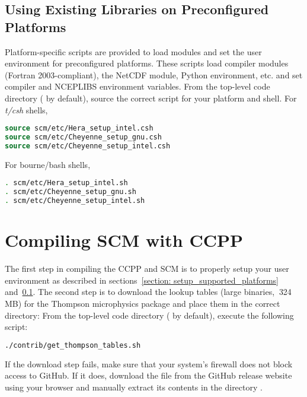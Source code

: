 \subsection{Using Existing Libraries on Preconfigured Platforms}\label{section: use_preconfigured_platforms}
Platform-specific scripts are provided to load modules and set the user environment for preconfigured platforms. These scripts load compiler modules (Fortran 2003-compliant), the NetCDF module, Python environment, etc. and set compiler and NCEPLIBS environment variables. From the top-level code directory ( by default), source the correct script for your platform and shell. For \textit{t/csh} shells,
\begin{lstlisting}[language=csh]
source scm/etc/Hera_setup_intel.csh
source scm/etc/Cheyenne_setup_gnu.csh
source scm/etc/Cheyenne_setup_intel.csh
\end{lstlisting}
For bourne/bash shells,
\begin{lstlisting}[language=bash]
. scm/etc/Hera_setup_intel.sh
. scm/etc/Cheyenne_setup_gnu.sh
. scm/etc/Cheyenne_setup_intel.sh
\end{lstlisting}

\section{Compiling SCM with CCPP}
\label{section: compiling}
The first step in compiling the CCPP and SCM is to properly setup your user environment as described in sections~\ref{section: setup_supported_platforms} and~\ref{section: use_preconfigured_platforms}. The second step is to download the lookup tables (large binaries, $~$324\,MB) for the Thompson microphysics package and place them in the correct directory:
From the top-level code directory ( by default), execute the following script:
\begin{lstlisting}[language=bash]
./contrib/get_thompson_tables.sh
\end{lstlisting}
If the download step fails, make sure that your system's firewall does not block access to GitHub. If it does, download the file  from the GitHub release website using your browser and manually extract its contents in the directory .


